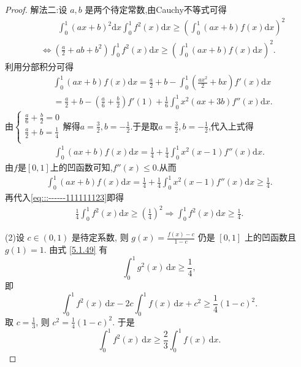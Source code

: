 \documentclass[../../main.tex]{subfiles}%
\begin{document}
\begin{proof}
{\color{blue}解法二:}设 \( a,b \) 是两个待定常数,由Cauchy不等式可得
\begin{align}
&\quad \quad \int_0^1{\left( ax+b \right) ^2\mathrm{d}x}\int_0^1{f^2\left( x \right) \mathrm{d}x}\geqslant \left( \int_0^1{\left( ax+b \right) f\left( x \right) \mathrm{d}x} \right) ^2\nonumber
\\
&\Longleftrightarrow \left( \frac{a}{2}+ab+b^2 \right) \int_0^1{f^2\left( x \right) \mathrm{d}x}\geqslant \left( \int_0^1{\left( ax+b \right) f\left( x \right) \mathrm{d}x} \right) ^2.\label{eq:::------111111123}
\end{align}
利用分部积分可得
\begin{align*}
&\int_0^1{\left( ax+b \right) f\left( x \right) \mathrm{d}x}=\frac{a}{2}+b-\int_0^1{\left( \frac{ax^2}{2}+bx \right) f' \left( x \right) \mathrm{d}x}
\\
&=\frac{a}{2}+b-\left( \frac{a}{6}+\frac{b}{2} \right) f'\left( 1 \right) +\frac{1}{6}\int_0^1{x^2\left( ax+3b \right) f'' \left( x \right) \mathrm{d}x}.
\end{align*}
由$\begin{cases}
\frac{a}{6}+\frac{b}{2}=0\\
\frac{a}{2}+b=\frac{1}{4}\\
\end{cases}$解得$a=\frac{3}{2},b=-\frac{1}{2}$.于是取$a=\frac{3}{2},b=-\frac{1}{2}$,代入上式得
\begin{align*}
\int_0^1{\left( ax+b \right) f\left( x \right) \mathrm{d}x}=\frac{1}{4}+\frac{1}{4}\int_0^1{x^2\left( x-1 \right) f'' \left( x \right) \mathrm{d}x}.
\end{align*}
由$f$是$[0,1]$上的凹函数可知,$f''(x)\leqslant 0.$从而
\begin{align*}
\int_0^1{\left( ax+b \right) f\left( x \right) \mathrm{d}x}=\frac{1}{4}+\frac{1}{4}\int_0^1{x^2\left( x-1 \right) f'' \left( x \right) \mathrm{d}x}\geqslant \frac{1}{4}.
\end{align*}
再代入\eqref{eq:::------111111123}即得
\begin{align*}
\frac{1}{4}\int_0^1{f^2\left( x \right) \mathrm{d}x}\geqslant \left( \frac{1}{4} \right) ^2\Longrightarrow \int_0^1{f^2\left( x \right) \mathrm{d}x}\geqslant \frac{1}{4}.
\end{align*}

(2)设 \( c \in (0,1) \) 是待定系数, 则 \( g(x) = \frac{f(x) - c}{1 - c} \) 仍是 \([0,1]\) 上的凹函数且 \( g(1) = 1 \). 由式 \eqref{5.1.49} 有
\[
\int_{0}^{1} g^2(x) \, \mathrm{d}x \geqslant \frac{1}{4},
\]
即
\[
\int_{0}^{1} f^2(x) \, \mathrm{d}x - 2c \int_{0}^{1} f(x) \, \mathrm{d}x + c^2 \geqslant \frac{1}{4}(1 - c)^2.
\]
取 \( c = \frac{1}{3} \), 则 \( c^2 = \frac{1}{4}(1 - c)^2 \). 于是
\[
\int_{0}^{1} f^2(x) \, \mathrm{d}x \geqslant \frac{2}{3} \int_{0}^{1} f(x) \, \mathrm{d}x.
\]

\end{proof}
\end{document}
